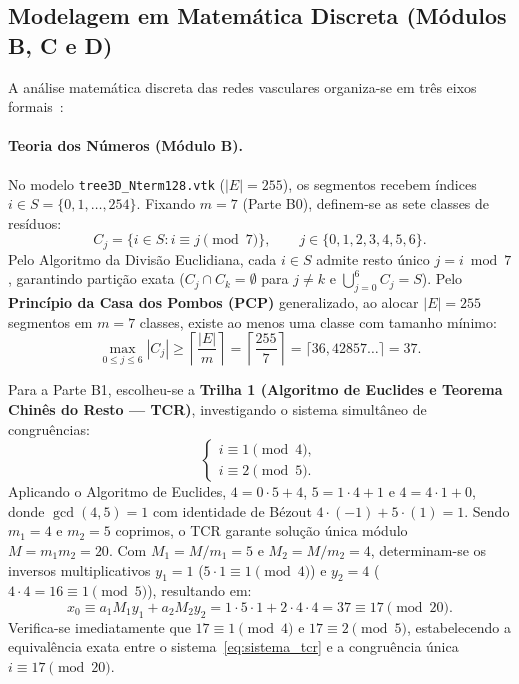 \documentclass[11pt, a4paper]{article}
\begin{document}
\subsection{Modelagem em Matemática Discreta (Módulos B, C e D)}

A análise matemática discreta das redes vasculares organiza-se em três eixos formais~\cite{rosen2019, scheinerman2011}:

\paragraph{Teoria dos Números (Módulo B).}
No modelo \texttt{tree3D\_Nterm128.vtk} ($|E| = 255$), os segmentos recebem índices $i \in S = \{0, 1, \dots, 254\}$. Fixando $m = 7$ (Parte B0), definem-se as sete classes de resíduos:
\begin{equation}
  C_j = \{i \in S : i \equiv j \pmod{7}\}, \qquad j \in \{0, 1, 2, 3, 4, 5, 6\}.
  \label{eq:classes_mod7}
\end{equation}
Pelo Algoritmo da Divisão Euclidiana, cada $i \in S$ admite resto único $j = i \bmod 7$, garantindo partição exata ($C_j \cap C_k = \emptyset$ para $j \neq k$ e $\bigcup_{j=0}^{6} C_j = S$). Pelo \textbf{Princípio da Casa dos Pombos (PCP)} generalizado, ao alocar $|E| = 255$ segmentos em $m = 7$ classes, existe ao menos uma classe com tamanho mínimo:
\begin{equation}
  \max_{0 \le j \le 6} |C_j| \ge \left\lceil \frac{|E|}{m} \right\rceil
  = \left\lceil \frac{255}{7} \right\rceil = \lceil 36{,}42857\dots \rceil = 37.
  \label{eq:pcp}
\end{equation}

Para a Parte B1, escolheu-se a \textbf{Trilha 1 (Algoritmo de Euclides e Teorema Chinês do Resto --- TCR)}, investigando o sistema simultâneo de congruências:
\begin{equation}
  \begin{cases}
    i \equiv 1 \pmod{4}, \\
    i \equiv 2 \pmod{5}.
  \end{cases}
  \label{eq:sistema_tcr}
\end{equation}
Aplicando o Algoritmo de Euclides, $4 = 0\cdot 5 + 4$, $5 = 1\cdot 4 + 1$ e $4 = 4\cdot 1 + 0$, donde $\gcd(4, 5) = 1$ com identidade de Bézout $4\cdot(-1) + 5\cdot(1) = 1$. Sendo $m_1 = 4$ e $m_2 = 5$ coprimos, o TCR garante solução única módulo $M = m_1 m_2 = 20$. Com $M_1 = M/m_1 = 5$ e $M_2 = M/m_2 = 4$, determinam-se os inversos multiplicativos $y_1 = 1$ ($5\cdot 1 \equiv 1 \pmod 4$) e $y_2 = 4$ ($4\cdot 4 = 16 \equiv 1 \pmod 5$), resultando em:
\begin{equation}
  x_0 \equiv a_1 M_1 y_1 + a_2 M_2 y_2 = 1 \cdot 5 \cdot 1 + 2 \cdot 4 \cdot 4 = 37 \equiv 17 \pmod{20}.
  \label{eq:solucao_tcr}
\end{equation}
Verifica-se imediatamente que $17 \equiv 1 \pmod 4$ e $17 \equiv 2 \pmod 5$, estabelecendo a equivalência exata entre o sistema~\eqref{eq:sistema_tcr} e a congruência única $i \equiv 17 \pmod{20}$.
\end{document}
